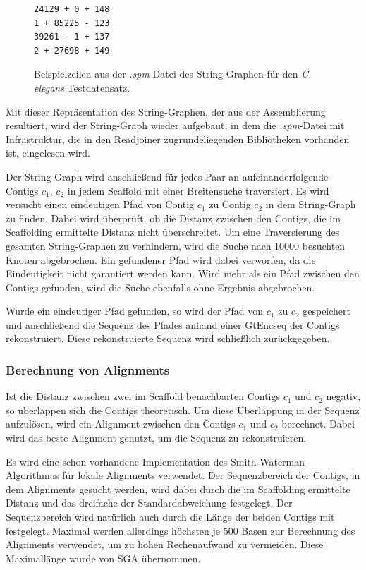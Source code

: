 \documentclass[a4paper,10pt,parskip]{scrartcl}
\begin{document}
\begin{figure}
  \centering
\begin{verbatim}
24129 + 0 + 148
1 + 85225 - 123
39261 - 1 + 137
2 + 27698 + 149
\end{verbatim}
\caption{\label{abb: spm}Beispielzeilen aus der \textit{.spm}-Datei des
  String-Graphen für den \textit{C. elegans} Testdatensatz.}
\end{figure}

Mit dieser Repräsentation des String-Graphen, der aus der
Assemblierung resultiert, wird der String-Graph wieder aufgebaut, in
dem die \textit{.spm}-Datei mit Infrastruktur, die in den Readjoiner
zugrundeliegenden Bibliotheken vorhanden ist, eingelesen wird.

Der String-Graph wird anschließend für jedes Paar an
aufeinanderfolgende Contigs $c_1$, $c_2$ in jedem Scaffold mit einer
Breitensuche traversiert. Es wird versucht einen eindeutigen Pfad von
Contig $c_1$ zu Contig $c_2$ in dem String-Graph zu finden. Dabei wird
überprüft, ob die Distanz zwischen den Contigs, die im Scaffolding
ermittelte Distanz nicht überschreitet. Um eine Traversierung des
gesamten String-Graphen zu verhindern, wird die Suche nach \num{10000}
besuchten Knoten abgebrochen. Ein gefundener Pfad wird dabei
verworfen, da die Eindeutigkeit nicht garantiert werden kann. Wird
mehr als ein Pfad zwischen den Contigs gefunden, wird die Suche
ebenfalls ohne Ergebnis abgebrochen.

Wurde ein eindeutiger Pfad gefunden, so wird der Pfad von $c_1$ zu
$c_2$ gespeichert und anschließend die Sequenz des Pfades anhand einer
GtEncseq der Contigs rekonstruiert. Diese rekonstruierte Sequenz wird
schließlich zurückgegeben.

\subsubsection{Berechnung von Alignments}
Ist die Distanz zwischen zwei im Scaffold benachbarten Contigs $c_1$
und $c_2$ negativ, so überlappen sich die Contigs theoretisch. Um
diese Überlappung in der Sequenz aufzulösen, wird ein Alignment
zwischen den Contigs $c_1$ und $c_2$ berechnet. Dabei wird das beste
Alignment genutzt, um die Sequenz zu rekonstruieren.

Es wird eine schon vorhandene Implementation des
Smith-Waterman-Algorithmus für lokale Alignments \cite{smith}
verwendet. Der Sequenzbereich der Contigs, in dem Alignments gesucht
werden, wird dabei durch die im Scaffolding ermittelte Distanz und das
dreifache der Standardabweichung festgelegt. Der Sequenzbereich wird
natürlich auch durch die Länge der beiden Contigs mit
festgelegt. Maximal werden allerdings höchsten je 500 Basen zur
Berechnung des Alignments verwendet, um zu hohen Rechenaufwand zu
vermeiden. Diese Maximallänge wurde von SGA übernommen.
\end{document}
